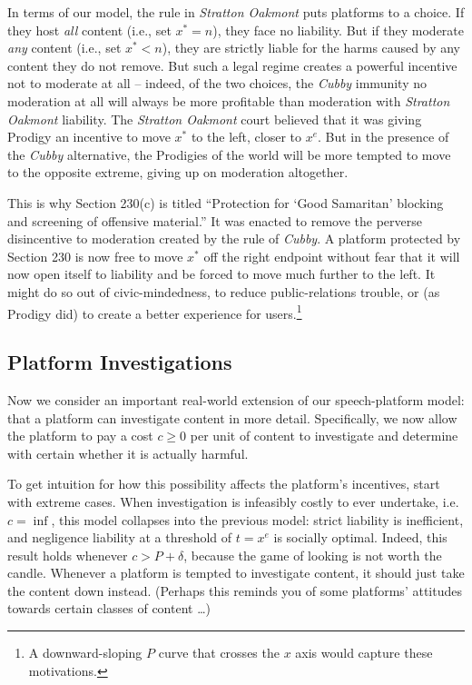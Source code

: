 In terms of our model, the rule in \emph{Stratton Oakmont} puts platforms to a choice. If they host \emph{all} content (i.e., set $x^* = n$), they face no liability. But if they moderate \emph{any} content (i.e., set $x^* < n$), they are strictly liable for the harms caused by any content they do not remove.  But such a legal regime creates a powerful incentive not to moderate at all -- indeed, of the two choices, the \emph{Cubby} immunity no moderation at all will always be more profitable than moderation with \emph{Stratton Oakmont} liability. The \emph{Stratton Oakmont} court believed that it was giving Prodigy an incentive to move $x^*$ to the left, closer to $x^e$. But in the presence of the \emph{Cubby} alternative, the Prodigies of the world will be more tempted to move to the opposite extreme, giving up on moderation altogether.

This is why Section 230(c) is titled ``Protection for `Good Samaritan' blocking and screening of offensive material.'' It was enacted to remove the perverse disincentive to moderation created by the rule of \emph{Cubby}. A platform protected by Section 230 is now free to move $x^*$ off the right endpoint without fear that it will now open itself to liability and be forced to move much further to the left. It might do so out of civic-mindedness, to reduce public-relations trouble, or (as Prodigy did) to create a better experience for users.\footnote{A downward-sloping $P$ curve that crosses the $x$ axis would capture these motivations.}


\subsection{Platform Investigations}

Now we consider an important real-world extension of our speech-platform model: that a platform can investigate content in more detail. Specifically, we now allow the platform to pay a cost $c \ge 0$ per unit of content to investigate and determine with certain whether it is actually harmful.

To get intuition for how this possibility affects the platform's incentives, start with extreme cases. When investigation is infeasibly costly to ever undertake, i.e. $c = \inf$, this model collapses into the previous model:  strict liability is inefficient, and negligence liability at a threshold of $t = x^e$ is socially optimal. Indeed, this result holds whenever $c > P + \delta$, because the game of looking is not worth the candle. Whenever a platform is tempted to investigate content, it should just take the content down instead. (Perhaps this reminds you of some platforms' attitudes towards certain classes of content \ldots)

